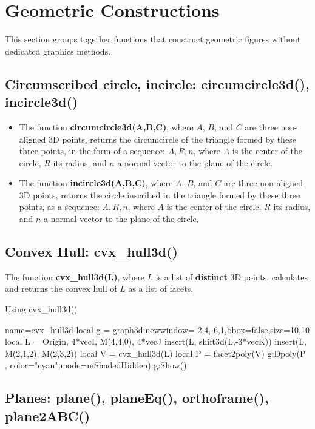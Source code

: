 \section{Geometric Constructions}

This section groups together functions that construct geometric figures without dedicated graphics methods.

\subsection{Circumscribed circle, incircle: circumcircle3d(), incircle3d()}

\begin{itemize}
    \item The function \textbf{circumcircle3d(A,B,C)}, where $A$, $B$, and $C$ are three non-aligned 3D points, returns the circumcircle of the triangle formed by these three points, in the form of a sequence: $A,R,n$, where $A$ is the center of the circle, $R$ its radius, and $n$ a normal vector to the plane of the circle.     \item The function \textbf{incircle3d(A,B,C)}, where $A$, $B$, and $C$ are three non-aligned 3D points, returns the circle inscribed in the triangle formed by these three points, as a sequence: $A,R,n$, where $A$ is the center of the circle, $R$ its radius, and $n$ a normal vector to the plane of the circle.
\end{itemize}

\subsection{Convex Hull: cvx\_hull3d()}

The function \textbf{cvx\_hull3d(L)}, where $L$ is a list of \textbf{distinct} 3D points, calculates and returns the convex hull of $L$ as a list of facets.

\begin{demo}{Using cvx\_hull3d()}
\begin{luadraw}{name=cvx_hull3d}
local g = graph3d:new{window={-2,4,-6,1},bbox=false,size={10,10}}
local L = {Origin, 4*vecI, M(4,4,0), 4*vecJ}
insert(L, shift3d(L,-3*vecK))
insert(L, {M(2,1,2), M(2,3,2)})
local V = cvx_hull3d(L)
local P = facet2poly(V)
g:Dpoly(P , {color="cyan",mode=mShadedHidden})
g:Show()
\end{luadraw}
\end{demo}

\subsection{Planes: plane(), planeEq(), orthoframe(), plane2ABC()}


